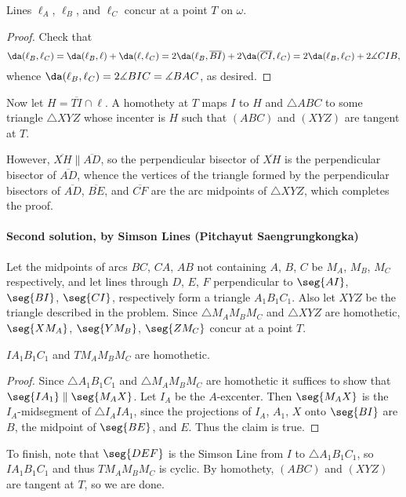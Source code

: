 \begin{claim*}
    Lines $\ell_A$, $\ell_B$, and $\ell_C$ concur at a point $T$ on $\omega$.
\end{claim*}
\begin{proof}
    Check that \[\da(\ell_B,\ell_C)=\da(\ell_B,\ell)+\da(\ell,\ell_C)=2\da(\ell_B,\overline{BI})+2\da(\overline{CI},\ell_C)=2\da(\ell_B,\ell_C)+2\measuredangle CIB,\]
    whence $\da(\ell_B,\ell_C)=2\measuredangle BIC=\measuredangle BAC$, as desired.
\end{proof}

Now let $H=\overline{TI}\cap\ell$. A homothety at $T$ maps $I$ to $H$ and $\triangle ABC$ to some triangle $\triangle XYZ$ whose incenter is $H$ such that $(ABC)$ and $(XYZ)$ are tangent at $T$.

However, $\overline{XH}\parallel\overline{AD}$, so the perpendicular bisector of $\overline{XH}$ is the perpendicular bisector of $\overline{AD}$, whence the vertices of the triangle formed by the perpendicular bisectors of $\overline{AD}$, $\overline{BE}$, and $\overline{CF}$ are the arc midpoints of $\triangle XYZ$, which completes the proof. 

\paragraph{Second solution, by Simson Lines (Pitchayut Saengrungkongka)}     Let the midpoints of arcs $BC$, $CA$, $AB$ not containing $A$, $B$, $C$ be $M_A$, $M_B$, $M_C$ respectively, and let lines through $D$, $E$, $F$ perpendicular to $\seg{AI}$, $\seg{BI}$, $\seg{CI}$, respectively form a triangle $A_1B_1C_1$. Also let $XYZ$ be the triangle described in the problem. Since $\triangle M_AM_BM_C$ and $\triangle XYZ$ are homothetic, $\seg{XM_A}$, $\seg{YM_B}$, $\seg{ZM_C}$ concur at a point $T$.
\begin{claim*}
    $IA_1B_1C_1$ and $TM_AM_BM_C$ are homothetic.
\end{claim*}
\begin{proof}
    Since $\triangle A_1B_1C_1$ and $\triangle M_AM_BM_C$ are homothetic it suffices to show that $\seg{IA_1}\parallel\seg{M_AX}$. Let $I_A$ be the $A$-excenter. Then $\seg{M_AX}$ is the $I_A$-midsegment of $\triangle I_AIA_1$, since the projections of $I_A$, $A_1$, $X$ onto $\seg{BI}$ are $B$, the midpoint of $\seg{BE}$, and $E$. Thus the claim is true.
\end{proof}

To finish, note that $\seg{DEF}$ is the Simson Line from $I$ to $\triangle A_1B_1C_1$, so $IA_1B_1C_1$ and thus $TM_AM_BM_C$ is cyclic. By homothety, $(ABC)$ and $(XYZ)$ are tangent at $T$, so we are done. 

